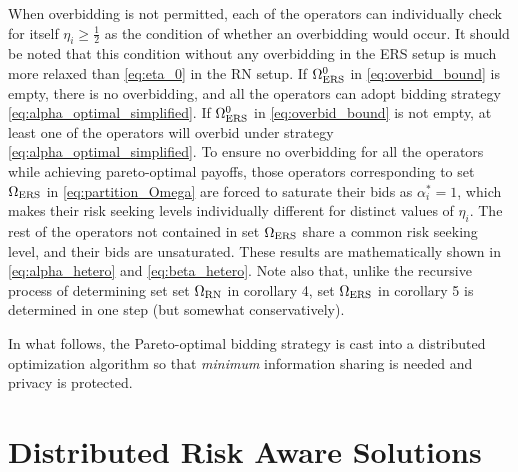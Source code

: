 \documentclass[conference]{IEEEtran}
\begin{document}
When overbidding is not permitted, each of the operators can individually check for itself $\eta_i\geq\tfrac12$ as the condition of whether an overbidding would occur. It should be noted that this condition without any overbidding in the ERS setup is much more relaxed than \eqref{eq:eta_0} in the RN setup. If $\Omega_{\rm ERS}^0$ in \eqref{eq:overbid_bound} is empty, there is no overbidding, and all the operators can adopt bidding strategy \eqref{eq:alpha_optimal_simplified}. If $\Omega_{\rm ERS}^0$ in \eqref{eq:overbid_bound} is not empty, at least one of the operators will overbid under strategy \eqref{eq:alpha_optimal_simplified}. To ensure no overbidding for all the operators while achieving pareto-optimal payoffs, those operators corresponding to set $\Omega_{\rm ERS}$ in \eqref{eq:partition_Omega} are forced to saturate their bids as $\alpha_i^*=1$, which makes their risk seeking levels individually different for distinct values of $\eta_i$. The rest of the operators not contained in set $\Omega_{\rm ERS}$ share a common risk seeking level, and their bids are unsaturated. These results are mathematically shown in \eqref{eq:alpha_hetero} and \eqref{eq:beta_hetero}. Note also that, unlike the recursive process of determining set set $\Omega_{\rm RN}$ in corollary 4, set $\Omega_{\rm ERS}$ in corollary 5 is determined in one step (but somewhat conservatively). 


In what follows, the Pareto-optimal bidding strategy is cast into a distributed optimization algorithm so that {\it minimum} information sharing is needed and privacy is protected.   

\section{Distributed Risk Aware Solutions}
\end{document}
